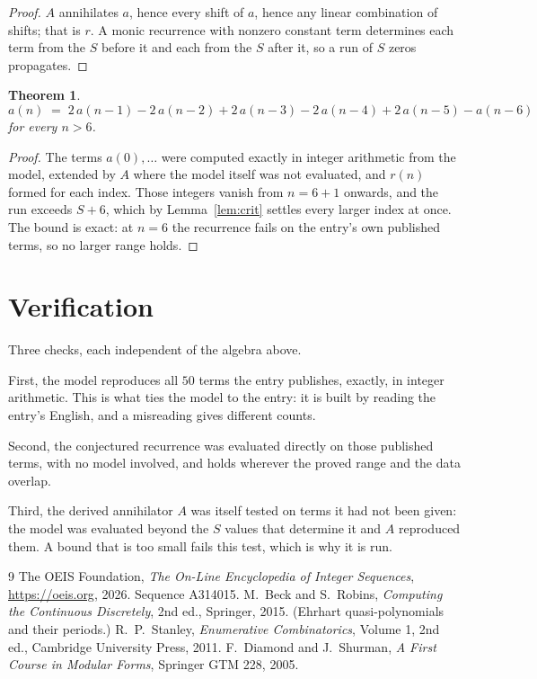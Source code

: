\documentclass[11pt,a4paper]{article}
\theoremstyle{plain}
\newtheorem{theorem}{Theorem}
\theoremstyle{definition}
\begin{document}
\begin{proof}
$A$ annihilates $a$, hence every shift of $a$, hence any linear combination of shifts; that is
$r$. A monic recurrence with nonzero constant term determines each term from the $S$ before it
and each from the $S$ after it, so a run of $S$ zeros propagates.
\end{proof}

\begin{theorem}
\[
a(n)\;=\;2\,a(n-1) - 2\,a(n-2) + 2\,a(n-3) - 2\,a(n-4) + 2\,a(n-5) - a(n-6)
\]
for every $n>6$.
\end{theorem}

\begin{proof}
The terms $a(0),\dots$ were computed exactly in integer arithmetic from the model, extended by
$A$ where the model itself was not evaluated, and $r(n)$ formed for each index. Those integers
vanish from $n=6+1$ onwards, and the run exceeds $S+6$, which by
Lemma~\ref{lem:crit} settles every larger index at once. The bound is exact: at $n=6$ the recurrence fails on the entry's own published terms, so no larger range holds.
\end{proof}

\section{Verification}

Three checks, each independent of the algebra above.

First, the model reproduces all $50$ terms the entry publishes, exactly, in integer
arithmetic. This is what ties the model to the entry: it is built by reading the entry's
English, and a misreading gives different counts.

Second, the conjectured recurrence was evaluated directly on those published terms, with no
model involved, and holds wherever the proved range and the data overlap.

Third, the derived annihilator $A$ was itself tested on terms it had not been given: the model
was evaluated beyond the $S$ values that determine it and $A$ reproduced them. A bound that is
too small fails this test, which is why it is run.

\begin{thebibliography}{9}
 The OEIS Foundation, \emph{The On-Line Encyclopedia of Integer
Sequences}, \url{https://oeis.org}, 2026. Sequence A314015.
 M.~Beck and S.~Robins, \emph{Computing the Continuous Discretely},
2nd ed., Springer, 2015. (Ehrhart quasi-polynomials and their periods.)
 R.~P.~Stanley, \emph{Enumerative Combinatorics}, Volume 1, 2nd ed.,
Cambridge University Press, 2011.
 F.~Diamond and J.~Shurman, \emph{A First Course in Modular Forms},
Springer GTM 228, 2005.
\end{thebibliography}
\end{document}
